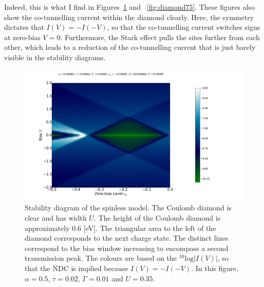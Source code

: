 Indeed, this is what I find in Figures~\ref{fig:diamond50} and ~\ref{fig:diamond75}. These figures also show the co-tunnelling current within the diamond clearly. Here, the symmetry dictates that $I(V)=-I(-V)$, so that the co-tunnelling current switches signs at zero-bias $V=0$. Furthermore, the Stark effect pulls the sites further from each other, which leads to a reduction of the co-tunnelling current that is just barely visible in the stability diagrams. 
\begin{figure}[htb]
    \centering
    \includegraphics[height=.38\textheight]{pdf/coulombd/current_map_diamond_alpha_05.pdf}
    \caption{Stability diagram of the spinless model. The Coulomb diamond is clear and has width $U$. The height of the Coulomb diamond is approximately $0.6$ [eV]. The triangular area to the left of the diamond corresponds to the next charge state. The distinct lines correspond to the bias window increasing to encompass a second transmission peak. The colours are based on the $^{10}\text{log}\left|I(V)\right|$, so that the NDC is implied because $I(V) = -I(-V)$. In this figure, $\alpha=0.5$, $\tau=0.02$, $\Gamma = 0.01$ and $U=0.35$.}
    \label{fig:diamond50}
\end{figure}
